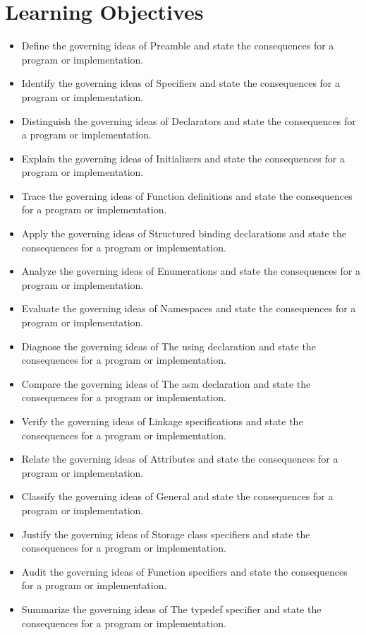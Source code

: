 \documentclass[11pt,letterpaper]{article}
\begin{document}
\section{Learning Objectives}
\begin{itemize}[label=\textcolor{CornellReferenceTeal}{$\blacktriangleright$}]
\item Define the governing ideas of Preamble and state the consequences for a program or implementation.
\item Identify the governing ideas of Specifiers and state the consequences for a program or implementation.
\item Distinguish the governing ideas of Declarators and state the consequences for a program or implementation.
\item Explain the governing ideas of Initializers and state the consequences for a program or implementation.
\item Trace the governing ideas of Function definitions and state the consequences for a program or implementation.
\item Apply the governing ideas of Structured binding declarations and state the consequences for a program or implementation.
\item Analyze the governing ideas of Enumerations and state the consequences for a program or implementation.
\item Evaluate the governing ideas of Namespaces and state the consequences for a program or implementation.
\item Diagnose the governing ideas of The using declaration and state the consequences for a program or implementation.
\item Compare the governing ideas of The asm declaration and state the consequences for a program or implementation.
\item Verify the governing ideas of Linkage specifications and state the consequences for a program or implementation.
\item Relate the governing ideas of Attributes and state the consequences for a program or implementation.
\item Classify the governing ideas of General and state the consequences for a program or implementation.
\item Justify the governing ideas of Storage class specifiers and state the consequences for a program or implementation.
\item Audit the governing ideas of Function specifiers and state the consequences for a program or implementation.
\item Summarize the governing ideas of The typedef specifier and state the consequences for a program or implementation.
\end{itemize}
\end{document}
